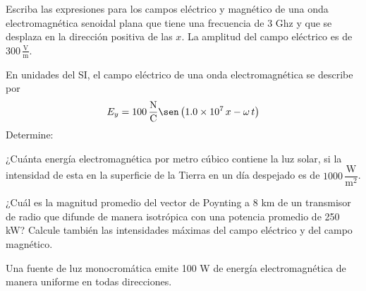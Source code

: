 \documentclass[addpoints]{exam}
\newcommand{\E}[1]{\times 10^{#1}}
\begin{document}
\begin{questions}
    \question Escriba las expresiones para los campos eléctrico y magnético de una onda electromagnética senoidal plana que tiene una frecuencia de 3 Ghz y que se desplaza en la dirección positiva de las $x$. La amplitud del campo eléctrico es de $300 \, \frac{\text{V}}{\text{m}}$.

    \question En unidades del SI, el campo eléctrico de una onda electromagnética se describe por $$ E_y = 100 \, \frac{\text{N}}{\text{C}} \sen \left(1.0 \E{7} \, x - \omega \, t\right)$$ Determine:

    \question ¿Cuánta energía electromagnética por metro cúbico contiene la luz solar, si la intensidad de esta en la superficie de la Tierra en un día despejado es de $1000 \, \dfrac{\text{W}}{\text{m}^2}$.

    \question ¿Cuál es la magnitud promedio del vector de Poynting a 8 km de un transmisor de radio que difunde de manera isotrópica con una potencia promedio de 250 kW? Calcule también las intensidades máximas del campo eléctrico y del campo magnético.

    \question Una fuente de luz monocromática emite 100 W de energía electromagnética de manera uniforme en todas direcciones.


\end{questions}
\end{document}
